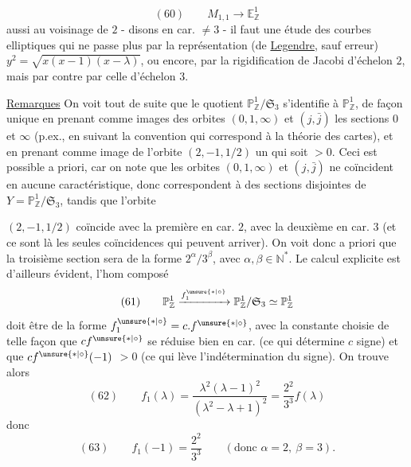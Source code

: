 
\[
(60)\qquad
M_{1,1}\longrightarrow\mathbb E^1_{\mathbb Z}
\]
aussi au voisinage de $2$ - disons en car. $\ne 3$ - il faut une étude
des courbes elliptiques qui ne passe plus par la représentation
(de \uline{Legendre}, sauf erreur)
$y^{2}=\sqrt{x(x-1)(x-\lambda)}$, ou encore, par la rigidification de
Jacobi d'échelon $2$, mais par contre par celle d'échelon $3$.

\uline{Remarques} On voit tout de suite que le quotient
$\mathbb P^1_{\mathbb Z}/\mathfrak S_3$ s'identifie à
$\mathbb P^1_{\mathbb Z}$, de façon unique en prenant comme images des
orbites $(0,1,\infty)$ et $(j,\bar j)$ les sections $0$ et $\infty$
(p.ex., en suivant la convention qui correspond à la théorie des cartes),
et en prenant comme image de l'orbite $(2,-1,1/2)$ un
 qui soit $>0$.
Ceci est possible a priori, car on note que les 
orbites $(0,1,\infty)$ et $(j,\bar j)$
ne coïncident en aucune caractéristique, donc correspondent à des sections
disjointes de $Y=\mathbb P^1_{\mathbb Z}/\mathfrak S_3$,
tandis que l'orbite 


$(2,-1,1/2)$ coïncide avec la première en car. $2$, avec la deuxième en
car. $3$ (et ce sont là les seules coïncidences qui peuvent arriver).
On voit donc a priori que la troisième section sera de la forme
$2^\alpha/3^\beta$, avec $\alpha,\beta\in\mathbb N^*$.
Le calcul explicite est d'ailleurs évident, l'hom composé
\[
(61)\qquad
\mathbb P^1_{\mathbb Z}
\xrightarrow{f_1^{\unsure{*|\circ}}}
\mathbb P^1_{\mathbb Z}/\mathfrak S_3
\simeq\mathbb P^1_{\mathbb Z}
\]
doit être de la forme
$f_1^{\unsure{*|\circ}}=c.f^{\unsure{*|\circ}}$, avec la constante
 choisie de telle façon que
$cf^{\unsure{*|\circ}}$  se réduise bien en
 car. (ce qui détermine $c$  signe)
et que
$cf^{\unsure{*|\circ}}(-1)$  $>0$
(ce qui lève l'indétermination du signe).
On trouve alors
\[
(62)\qquad
f_1(\lambda)=
\frac{\lambda^2(\lambda-1)^2}{(\lambda^2-\lambda+1)^{2}}
=\frac{2^2}{3^3}f(\lambda)
\]
donc
\[
(63)\qquad
f_1(-1)=\frac{2^2}{3^3}
\qquad(\text{donc }\alpha=2,\ \beta=3).
\]

